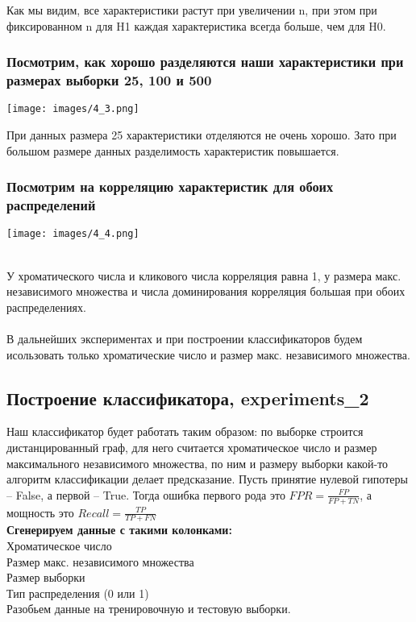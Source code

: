 \documentclass[a4paper,12pt]{article}
\begin{document}
Как мы видим, все характеристики растут при увеличении n, при этом при фиксированном n для H1 каждая характеристика всегда больше, чем для H0.


\subsubsection*{Посмотрим, как хорошо разделяются наши характеристики при размерах выборки 25, 100 и 500}

\begin{center}
\texttt{[image: images/4\_3.png]} \end{center}

При данных размера 25 характеристики отделяются не очень хорошо. Зато при большом размере данных разделимость характеристик повышается.


\subsubsection*{Посмотрим на корреляцию характеристик для обоих распределений}

\begin{center}
\texttt{[image: images/4\_4.png]} \end{center}
\\
У хроматического числа и кликового числа корреляция равна 1, у размера макс. независимого множества и числа доминирования корреляция большая при обоих распределениях.\\
\\
В дальнейших экспериментах и при построении классификаторов будем исользовать только хроматические число и размер макс. независимого множества.

\subsection{Построение классификатора, experiments\_2}

Наш классификатор будет работать таким образом: по выборке строится дистанцированный граф, для него считается хроматическое число и размер максимального независимого множества, по ним и размеру выборки какой-то алгоритм классификации делает предсказание.
Пусть принятие нулевой гипотеры -- False, а первой -- True. Тогда ошибка первого рода это $FPR =\frac{FP}{FP + TN}$, 
а мощность это $Recall = \frac{TP}{TP + FN}$
\\
\textbf{Сгенерируем данные с такими колонками:}\\
Хроматическое число\\
Размер макс. независимого множества\\
Размер выборки\\
Тип распределения (0 или 1)\\
Разобьем данные на тренировочную и тестовую выборки.
\end{document}
